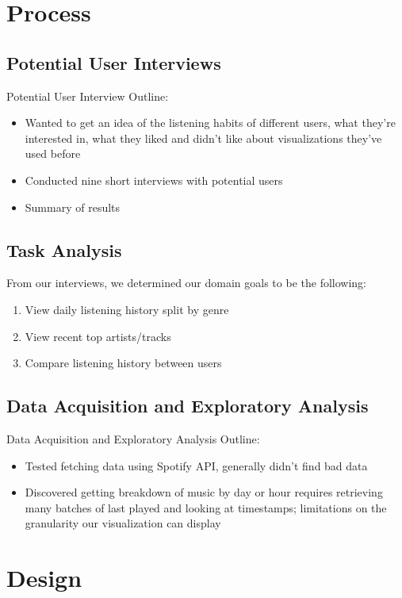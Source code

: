 \documentclass[journal]{vgtc}                %
\begin{document}
\section{Process}

\subsection{Potential User Interviews}
Potential User Interview Outline:
\begin{itemize}
  \item Wanted to get an idea of the listening habits of different users, what they're interested in, what they liked and didn't like about visualizations they've used before
  \item Conducted nine short interviews with potential users
  \item Summary of results
\end{itemize}

\subsection{Task Analysis}

From our interviews, we determined our domain goals to be the following:
\begin{enumerate}
  \item View daily listening history split by genre
  \item View recent top artists/tracks
  \item Compare listening history between users
\end{enumerate}


\subsection{Data Acquisition and Exploratory Analysis}
Data Acquisition and Exploratory Analysis Outline:
\begin{itemize}
  \item Tested fetching data using Spotify API, generally didn't find bad data
  \item Discovered getting breakdown of music by day or hour requires retrieving many batches of last played and looking at timestamps; limitations on the granularity our visualization can display
\end{itemize}

\section{Design}
\end{document}
